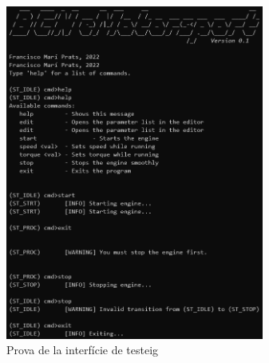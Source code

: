 \begin{figure}[!htb]
    \centering
    \captionsetup{justification=centering,margin=1.5cm}
    \includegraphics[width=8.5cm]
        { img/5_resultats/interficie.png }
    \caption*{ Prova de la interfície de testeig }
\end{figure}